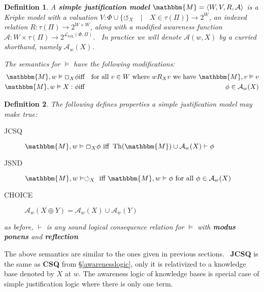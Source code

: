 \documentclass{article}
\newcommand{\tmop}[1]{\ensuremath{\operatorname{#1}}}
\newcommand{\tmstrong}[1]{\textbf{#1}}
\newcommand{\tmtextbf}[1]{{\bfseries{#1}}}
\newenvironment{descriptiondash}{\begin{description} }{\end{description}}
\newtheorem{definition}{Definition}
\begin{document}
\begin{definition}
  \label{justmodels}A {\tmstrong{simple justification model}} $\mathbbm{M}=
  \langle W, V, R, \mathcal{A} \rangle$ is a Kripke model with a valuation $V
  : \Phi \cup \{\circlearrowleft_X \hspace{1em} | \hspace{1em} X \in \tau
  (\Pi)\} \rightarrow 2^W$, an indexed relation $R : \tau (\Pi) \rightarrow
  2^{W \times W}$, along with a modified awareness function $\mathcal{A} : W
  \times \tau (\Pi) \rightarrow 2^{\mathcal{L}_{\tmop{SJL}} (\Phi, \Pi)}$. \
  In practice we will denote $\mathcal{A} (w, X)$ by a curried shorthand,
  namely $\mathcal{A}_w (X)$.
  
  
  
  The semantics for $\vDash$ have the following modifications:
  \begin{eqnarray*}
    \mathbbm{M}, w \vDash \Box_X \phi & \text{iff} & \text{for all $v \in W$
    where $w R_X v$ we have $\mathbbm{M}, v \vDash v$}\\
    \mathbbm{M}, w \vDash X : \phi & \text{iff} & \phi \in \mathcal{A}_w (X)
  \end{eqnarray*}
\end{definition}

\begin{definition}
  The following defines properties a simple justification model may make true:
  
  \begin{descriptiondash}
    \item[JCSQ] $\mathbbm{M}, w \vDash \Box_X \phi \text{ iff } \tmop{Th}
    (\mathbbm{M}) \cup \mathcal{A}_w (X) \vdash \phi$
    
    \item[JSND] $\mathbbm{M}, w \vDash \circlearrowleft_X \text{ iff
    $\mathbbm{M}, w \vDash \phi$ for all $\phi \in \mathcal{A}_w (X)$}$
    
    \item[CHOICE] $\mathcal{A}_w (X \oplus Y) = \mathcal{A}_w (X) \cup
    \mathcal{A}_w (Y)$
  \end{descriptiondash}
  
  as before, $\vdash$ is any sound logical consequence relation for $\vDash$
  with \tmtextbf{modus ponens} and \tmtextbf{reflection}
\end{definition}

The above semantics are similar to the ones given in previous sections. \
\tmtextbf{JCSQ} is the same as \tmtextbf{CSQ} from {\S}\ref{awarenesslogic},
only it is relativized to a knowledge base denoted by $X$ at $w$.  The
awareness logic of knowledge bases is special case of simple justification
logic where there is only one term.
\end{document}
